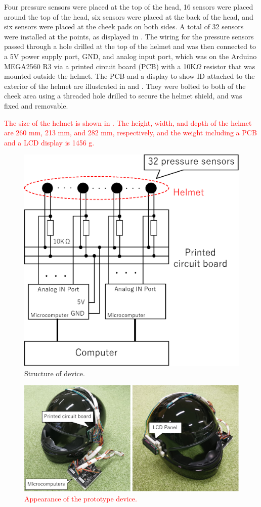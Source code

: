 \documentclass[english,preprint,JIP]{ipsj}
\begin{document}
Four pressure sensors were placed at the top of the head, 16 sensors were placed around the top of the head, six sensors were placed at the back of the head, and six sensors were placed at the cheek pads on both sides. A total of 32 sensors were installed at the points, as displayed in . The wiring for the pressure sensors passed through a hole drilled at the top of the helmet and was then connected to a 5V power supply port, GND, and analog input port, which was on the Arduino MEGA2560 R3 via a printed circuit board (PCB) with a 10K$\Omega$ resistor that was mounted outside the helmet. The PCB and a display to show ID attached to the exterior of the helmet are illustrated in  and . They were bolted to both of the cheek area using a threaded hole drilled to secure the helmet shield, and was fixed and removable.\par

\textcolor{red}{The size of the helmet is shown in . The height, width, and depth of the helmet are 260 mm, 213 mm, and 282 mm, respectively, and the weight including a PCB and a LCD display is 1456 g.}

\begin{figure}[!t]
  \begin{center}
    \includegraphics[width=0.6\linewidth]{figure/device.eps}
  \end{center}
  \caption{Structure of device.}
  \label{fig:device}
\end{figure}

\begin{figure}[!t]
  \centering
    \includegraphics[width=0.9\linewidth]{figure/met_over.eps}
  \caption{\textcolor{red}{Appearance of the prototype device.}}
  \label{fig:met_over}
\end{figure}
\end{document}
